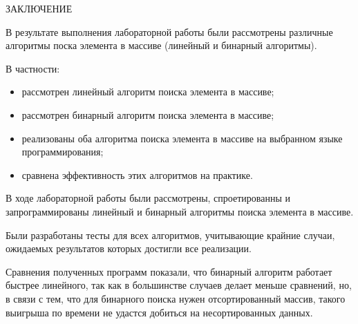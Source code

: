 \begin{center}
    \MakeUppercase{\large Заключение}
\end{center}

В результате выполнения лабораторной работы были рассмотрены различные алгоритмы поска элемента в массиве (линейный и бинарный алгоритмы).

\vspace{0.25cm}
В частности:

\begin{itemize}

\item рассмотрен линейный алгоритм поиска элемента в массиве;

\item рассмотрен бинарный алгоритм поиска элемента в массиве;

\item реализованы оба алгоритма поиска элемента в массиве на выбранном языке программирования;

\item сравнена эффективность этих алгоритмов на практике.

\end{itemize}

В ходе лабораторной работы были рассмотрены, спроетированны и запрограммированы линейный и бинарный алгоритмы поиска элемента в массиве.

Были разработаны тесты для всех алгоритмов, учитывающие крайние случаи, ожидаемых результатов которых достигли все реализации.

Сравнения полученных программ показали, что бинарный алгоритм работает быстрее линейного, так как в большинстве случаев делает меньше сравнений, но, в связи с тем, что для бинарного поиска нужен отсортированный массив, такого выигрыша по времени не удастся добиться на несортированных данных.

\newpage